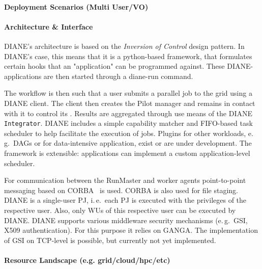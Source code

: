 \documentclass{sig-alternate}
\begin{document}


\paragraph{Deployment Scenarios (Multi User/VO)}



\paragraph{Architecture \& Interface}

DIANE's architecture is based on the \textit{Inversion of Control} design pattern.
In DIANE's case, this means that it is a python-based framework, that
formulates certain hooks that an "application" can be programmed against.
These DIANE-applications are then started through a diane-run command.

The workflow is then such that a user submits a parallel job to
the grid using a DIANE client.  The client then creates the Pilot manager
and remains in contact with it to control its \pilotjobs.  Results
are aggregated through use means of the DIANE
\texttt{Integrator}.
DIANE includes a simple capability matcher and FIFO-based task scheduler
to help facilitate the execution of jobs.
Plugins for other workloads, e.\,g.\ DAGs or for data-intensive
application, exist or are under development. The framework is extensible:
applications can implement a custom application-level scheduler.

For communication between the RunMaster and
worker agents point-to-point messaging based on CORBA~\cite{OMG-CORBA303:2004}
is used. CORBA is also used for file staging.
DIANE is a single-user PJ, i.\,e.\ each PJ is executed with the
privileges of the respective user. Also, only WUs of this respective user can be
executed by DIANE. DIANE supports various middleware security mechanisms
(e.\,g.\ GSI, X509 authentication). For this purpose it relies on GANGA. The
implementation of GSI on TCP-level is possible, but currently not yet
implemented. 


\paragraph{Resource Landscape (e.g. grid/cloud/hpc/etc)}
\end{document}
